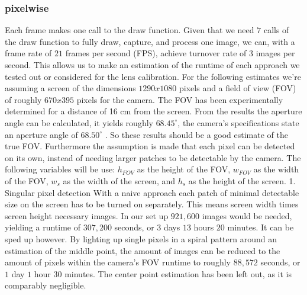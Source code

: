 \documentclass[journal,final,a4paper,twoside]{PS}
\begin{document}
\subsubsection{pixelwise}
\label{sec:pixelwise}
Each frame makes one call to the draw function. Given that we need $7$ calls of the draw function to fully draw, capture, and process one image, we can, with a frame rate of $21$ frames per second (FPS), achieve turnover rate of $3$ images per second. This allows us to make an estimation of the runtime of each approach we tested out or considered for the lens calibration. For the following estimates we're assuming a screen of the dimensions $1290 x 1080$ pixels and a field of view (FOV) of roughly $670 x 395$ pixels for the camera. The FOV has been experimentally determined for a distance of 16 cm from the screen. From the results the aperture angle can be calculated, it yields roughly $68.45^{\circ}$, the camera’s specifications state an aperture angle of $68.50 ^{\circ}$ . So these results should be a good estimate of the true FOV. Furthermore the assumption is made that each pixel can be detected on its own, instead of needing larger patches to be detectable by the camera.
The following variables will be use: $h_{FOV}$ as the height of the FOV, $w_{FOV}$ as the width of the FOV, $w_s$ as the width of the screen, and $h_s$ as the height of the screen.
1. Singular pixel detection
With a naive approach each patch of minimal detectable size on the screen has to be turned on separately. This means screen width times screen height necessary images. In our set up $921,600$ images would be needed, yielding a runtime of $307,200$ seconds, or $3$ days $13$ hours $20$ minutes.
It can be sped up however. By lighting up single pixels in a spiral pattern around an estimation of the middle point, the amount of images can be reduced to the amount of pixels within the camera’s FOV runtime to roughly $88,572$ seconds, or $1$ day $1$ hour $30$ minutes.
The center point estimation has been left out, as it is comparably negligible.\\
	
\end{document}
